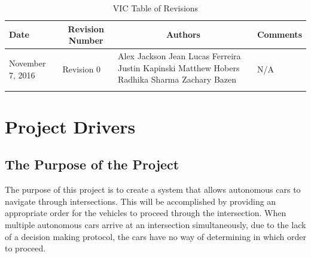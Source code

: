 \documentclass [12pt]{article}
\begin{document}
\thispagestyle{empty}
\begin{longtable}{| p{ } | p{ } | p{ } | p{ } |}

\hline 
\centering \textbf{Date} & 
\multicolumn{1}{c}{\textbf {Revision Number}} &
\multicolumn{1}{|c}{\textbf {Authors}} & 
\multicolumn{1}{|c|}{\textbf {Comments}} \\ \hline

\multirow{4}{*}{\centering November 7, 2016}  & 
\multirow{4}{*}{Revision 0}& 
{Alex Jackson \newline
Jean Lucas Ferreira \newline
Justin Kapinski\newline
Matthew Hobers\newline
Radhika Sharma\newline
Zachary Bazen}
&
 \multirow{4}{*}{N/A} \\ 
\hline 

\caption{VIC Table of Revisions} 
\end{longtable}
\pagebreak



\section {\textbf{Project Drivers}}


\subsection{The Purpose of the Project} 

The purpose of this project is to create a system that allows autonomous cars to navigate through  intersections. This will be accomplished by providing an appropriate order for the vehicles to proceed through the intersection. When multiple autonomous cars arrive at an intersection simultaneously, due to the lack of a decision making protocol, the cars have no way of determining in which order to proceed. \newline
\end{document}
